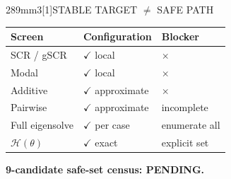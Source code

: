 \documentclass[final]{beamer}
\newcommand{\PosterPending}{\textcolor{IASGray}{\bfseries PENDING}}
\newcommand{\TableSize}{\fontsize{26pt}{29pt}\selectfont}
\begin{document}
\begin{frame}[t]
\begin{minipage}[t][289mm][t]{226mm}
\begin{PosterPanel}{289mm}{3}{\scalebox{0.86}[1]{STABLE TARGET $\ne$ SAFE PATH}}
{\begin{tabularx}{\linewidth}{@{}>{\RaggedRight\arraybackslash}p{55mm}>{\RaggedRight\arraybackslash}p{71mm}>{\RaggedRight\arraybackslash}X@{}}
        \textbf{Screen} & \textbf{Configuration} & \textbf{Blocker}\\
        \midrule
        SCR / gSCR & \textcolor{IASBlue}{$\checkmark$} local & \textcolor{IASVermillion}{$\times$}\\
        Modal & \textcolor{IASBlue}{$\checkmark$} local & \textcolor{IASVermillion}{$\times$}\\
        Additive & \textcolor{IASBlue}{$\checkmark$} approximate & \textcolor{IASVermillion}{$\times$}\\
        Pairwise & \textcolor{IASBlue}{$\checkmark$} approximate & \textcolor{IASGold!70!black}{incomplete}\\
        Full eigensolve & \textcolor{IASBlue}{$\checkmark$} per case & enumerate all\\
        $\mathcal H(\theta)$ & \textcolor{IASBlue}{$\checkmark$} exact & explicit set\\
      \end{tabularx}}
    \vspace{1mm}
    {\colorbox{IASPaleGold}{\parbox[c][20mm][c]{\dimexpr\linewidth-2\fboxsep\relax}{\centering
      {\TableSize\bfseries\color{IASDarkText}9-candidate safe-set census: \PosterPending.}}}}
  \end{PosterPanel}
\end{minipage}\par
\vspace{3mm}


\end{frame}
\end{document}
